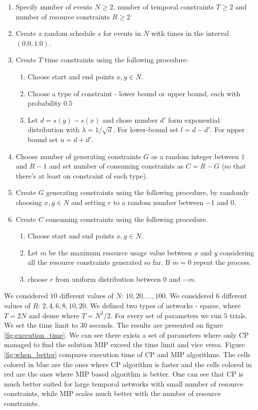   \begin{enumerate}
  \setlength\itemsep{0.1em}
  \item Specify number of events $N \geq 2$, number of temporal constraints $T\geq 2$ and number of resource constraints $R\geq 2$
  \item Create a random schedule $s$ for events in $N$ with times in the interval $(0.0, 1.0)$.
  \item Create $T$ time constraints using the following procedure:
    \begin{enumerate}
    \item Choose start and end points $x,y \in N$.
    \item Choose a type of constraint - lower bound or upper bound, each with probability $0.5$
    \item Let $d=s(y) - s(x)$ and chose number $d'$ form exponential distribution with $\lambda = 1 / \sqrt{d}$. For lower-bound set $l = d - d'$. For upper bound set $u = d + d'$.
    \end{enumerate}
  \item Choose number of generating constraints $G$ as a random integer between $1$ and $R-1$ and set number of consuming constraints as $C = R - G$ (so that there's at least on constraint of each type).
  \item Create $G$ generating constraints using the following procedure, by randomly choosing $x,y \in N$ and setting $r$ to a random number between $-1$ and $0$.
  \item Create $C$ consuming constraints using the following procedure.
    \begin{enumerate}
    \item Choose start and end points $x,y \in N$.
    \item Let $m$ be the maximum resource usage value between $x$ and $y$ considering all the resource constraints generated so far. If $m = 0$ repeat the process.
    \item choose $r$ from uniform distribution between $0$ and $-m$.
    \end{enumerate}
  \end{enumerate}

We considered $10$ different values of $N$: $10, 20, ..., 100$. We considered $6$ different values of $R$: $2, 4, 6, 8, 10, 20$. We defined two types of networks - sparse, where $T = 2N$ and dense where $T = N^2/2$. For every set of parameters we run $5$ trials. We set the time limit to $30$ seconds. The results are presented on figure \ref{fig:execution_time}. We can see there exists a set of parameters where only CP managed to find the solution MIP exceed the time limit and vice versa. Figure \ref{fig:when_better} compares execution time of CP and MIP algorithms. The cells colored in blue are the ones where CP algorithm is faster and the cells colored in red are the ones where MIP based algorithm is better. One can see that CP is much better suited for large temporal networks with small number of resource constraints, while MIP scales much better with the number of resource constraints.

